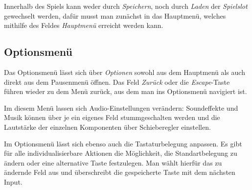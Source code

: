 Innerhalb des Spiels kann weder durch \textit{Speichern}, noch durch
\textit{Laden} der \textit{Spielslot} gewechselt werden, dafür musst man
zunächst in das Hauptmenü, welches mithilfe des Feldes \textit{Hauptmenü}
erreicht werden kann.

\subsection{Optionsmenü}\label{sec:menu-options}

Das Optionsmenü lässt sich über \textit{Optionen} sowohl aus dem Hauptmenü als
auch direkt aus dem Pausenmenü öffnen. Das Feld \textit{Zurück} oder die
\textit{Escape}-Taste führen wieder zu dem Menü zurück, aus dem man ins
Optionsmenü navigiert ist.

Im diesem Menü lassen sich Audio-Einstellungen verändern: Soundeffekte und
Musik können über je ein eigenes Feld stummgeschalten werden und die Lautstärke
der einzelnen Komponenten über Schieberegler einstellen.

Im Optionsmenü lässt sich ebenso auch die Tastaturbelegung anpassen. Es gibt
für alle individualisierbare Aktionen die Möglichkeit, die Standartbelegung zu
ändern oder eine alternative Taste festzulegen. Man wählt hierfür das zu
ändernde Feld aus und überschreibt die gespeicherte Taste mit dem nächsten
Input.

\clearpage
